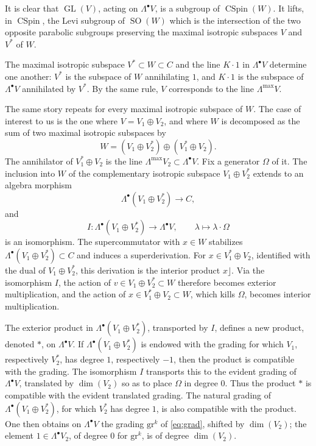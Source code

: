 \documentclass[11pt,a4paper]{article}
\theoremstyle{plain}
\theoremstyle{definition}
\DeclareMathOperator{\CSpin}{CSpin}
\DeclareMathOperator{\GL}{GL}
\DeclareMathOperator{\SO}{SO}
\begin{document}
It is clear that $\GL(V)$, acting on $\Lambda^\bullet V$, is a subgroup of $\CSpin(W)$. It lifts, in $\CSpin$, the Levi subgroup of $\SO(W)$ which is the intersection of the two opposite parabolic subgroups preserving the maximal isotropic subspaces $V$ and $V^*$ of $W$.

The maximal isotropic subspace $V^* \subset W \subset C$ and the line $K \cdot 1$ in $\Lambda^\bullet V$ determine one another: $V^*$ is the subspace of $W$ annihilating $1$, and $K \cdot 1$ is the subspace of $\Lambda^\bullet V$ annihilated by $V^*$. By the same rule, $V$ corresponds to the line $\Lambda^{\max} V$.

The same story repeats for every maximal isotropic subspace of $W$. The case of interest to us is the one where $V = V_1 \oplus V_2$, and where $W$ is decomposed as the sum of two maximal isotropic subspaces by
\[
W = (V_1 \oplus V_2^*) \oplus (V_1^* \oplus V_2) .
\]
The annihilator of $V_1^* \oplus V_2$ is the line $\Lambda^{\max} V_2 \subset \Lambda^\bullet V$. Fix a generator $\Omega$ of it. The inclusion into $W$ of the complementary isotropic subspace $V_1 \oplus V_2^*$ extends to an algebra morphism
\[
\Lambda^\bullet(V_1 \oplus V_2^*) \longrightarrow C ,
\]
and
\begin{equation}\label{eq:isom}
I : \Lambda^\bullet(V_1 \oplus V_2^*) \longrightarrow \Lambda^\bullet V, \qquad \lambda \longmapsto \lambda \cdot \Omega
\end{equation}
is an isomorphism. The supercommutator with $x \in W$ stabilizes $\Lambda^\bullet(V_1 \oplus V_2^*) \subset C$ and induces a superderivation. For $x \in V_1^* \oplus V_2$, identified with the dual of $V_1 \oplus V_2^*$, this derivation is the interior product $x \rfloor$. Via the isomorphism $I$, the action of $v \in V_1 \oplus V_2^* \subset W$ therefore becomes exterior multiplication, and the action of $x \in V_1^* \oplus V_2 \subset W$, which kills $\Omega$, becomes interior multiplication.

The exterior product in $\Lambda^\bullet(V_1 \oplus V_2^*)$, transported by $I$, defines a new product, denoted $*$, on $\Lambda^\bullet V$. If $\Lambda^\bullet(V_1 \oplus V_2^*)$ is endowed with the grading for which $V_1$, respectively $V_2^*$, has degree $1$, respectively $-1$, then the product is compatible with the grading. The isomorphism $I$ transports this to the evident grading of $\Lambda^\bullet V$, translated by $\dim(V_2)$ so as to place $\Omega$ in degree $0$. Thus the product $*$ is compatible with the evident translated grading. The natural grading of $\Lambda^\bullet(V_1 \oplus V_2^*)$, for which $V_2^*$ has degree $1$, is also compatible with the product. One then obtains on $\Lambda^\bullet V$ the grading $\mathrm{gr}^k$ of \eqref{eq:grad}, shifted by $\dim(V_2)$; the element $1 \in \Lambda^\bullet V_2$, of degree $0$ for $\mathrm{gr}^k$, is of degree $\dim(V_2)$.
\end{document}
